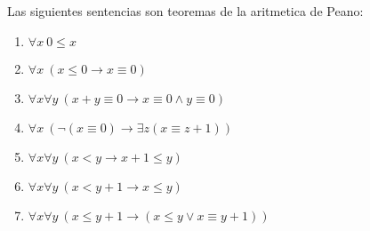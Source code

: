   \begin{lemma}
    Las siguientes sentencias son teoremas de la aritmetica de Peano:
    \begin{enumerate}
      \item $\forall x\ 0\leq x$
      \item $\forall x\ (x\leq0\rightarrow x\equiv 0)$
      \item $\forall x\forall y\ (x+y\equiv0\rightarrow x\equiv0\land y\equiv0)$
      \item $\forall x\ (\neg(x\equiv0)\rightarrow\exists z(x\equiv z+1))$
      \item $\forall x\forall y\ (x<y\rightarrow x+1\leq y)$
      \item $\forall x\forall y\ (x<y+1\rightarrow x\leq y)$
      \item $\forall x\forall y\ (x\leq y+1\rightarrow (x\leq y\lor x\equiv y+1))$
    \end{enumerate}
  \end{lemma}
